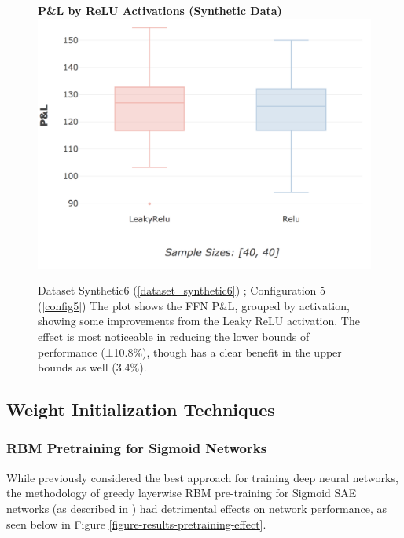 \documentclass[a4paper,11pt,oneside]{article}
\theoremstyle{plain}
\theoremstyle{definition}
\begin{document}
	\begin{figure}[H]
		\textbf{P\&L by ReLU Activations (Synthetic Data)}
		\centering
		\includegraphics[scale=0.3]{images/results/activations/synthetic_pl_leakyrelu.png}
		\caption[P\&L by ReLU Activations (Synthetic Data)]{Dataset Synthetic6  (\ref{dataset_synthetic6}) ; Configuration 5 (\ref{config5})
			\newline The plot shows the FFN P\&L, grouped by activation, showing some improvements from the Leaky ReLU activation. The effect is most noticeable in reducing the lower bounds of performance (±10.8\%), though has a clear benefit in the upper bounds as well (3.4\%).}
		\label{figure-synthetic_pl_leakyrelu}
	\end{figure}
	
	\newpage
	\subsection{Weight Initialization Techniques}\label{results_init}
	
	\subsubsection{RBM Pretraining for Sigmoid Networks}
	
	While previously considered the best approach for training deep neural networks, the methodology of greedy layerwise RBM pre-training for Sigmoid SAE networks (as described in \cite{Hinton2}) had detrimental effects on network performance, as seen below in Figure \ref{figure-results-pretraining-effect}. \newline
	
\end{document}

